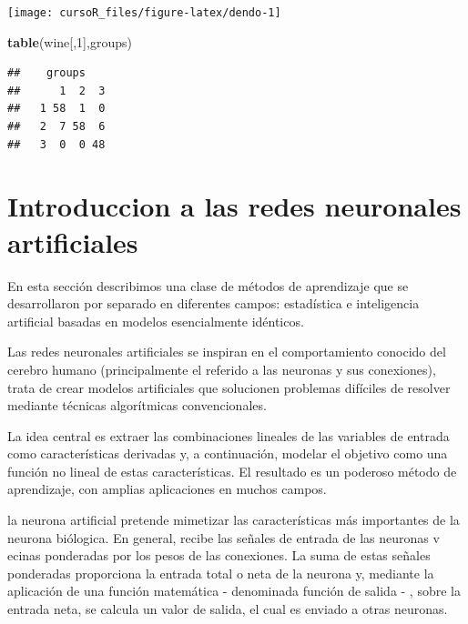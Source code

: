 \documentclass[]{book}
\newenvironment{Shaded}{\begin{snugshade}}{\end{snugshade}}
\newcommand{\KeywordTok}[1]{\textcolor[rgb]{0.13,0.29,0.53}{\textbf{#1}}}
\newcommand{\DecValTok}[1]{\textcolor[rgb]{0.00,0.00,0.81}{#1}}
\newcommand{\NormalTok}[1]{#1}
\begin{document}
\begin{center}\texttt{[image: cursoR\_files/figure-latex/dendo-1]} \end{center}

\begin{Shaded}
\begin{Highlighting}[]
\KeywordTok{table}\NormalTok{(wine[,}\DecValTok{1}\NormalTok{],groups)}
\end{Highlighting}
\end{Shaded}

\begin{verbatim}
##    groups
##      1  2  3
##   1 58  1  0
##   2  7 58  6
##   3  0  0 48
\end{verbatim}

\chapter{Introduccion a las redes neuronales
artificiales}\label{introduccion-a-las-redes-neuronales-artificiales}

En esta sección describimos una clase de métodos de aprendizaje que se
desarrollaron por separado en diferentes campos: estadística e
inteligencia artificial basadas en modelos esencialmente idénticos.

Las redes neuronales artificiales se inspiran en el comportamiento
conocido del cerebro humano (principalmente el referido a las neuronas y
sus conexiones), trata de crear modelos artificiales que solucionen
problemas difíciles de resolver mediante técnicas algorítmicas
convencionales.

La idea central es extraer las combinaciones lineales de las variables
de entrada como características derivadas y, a continuación, modelar el
objetivo como una función no lineal de estas características. El
resultado es un poderoso método de aprendizaje, con amplias aplicaciones
en muchos campos.

la neurona artificial pretende mimetizar las características más
importantes de la neurona biólogica. En general, recibe las señales de
entrada de las neuronas v ecinas ponderadas por los pesos de las
conexiones. La suma de estas señales ponderadas proporciona la entrada
total o neta de la neurona y, mediante la aplicación de una función
matemática - denominada función de salida - , sobre la entrada neta, se
calcula un valor de salida, el cual es enviado a otras neuronas.
\end{document}
